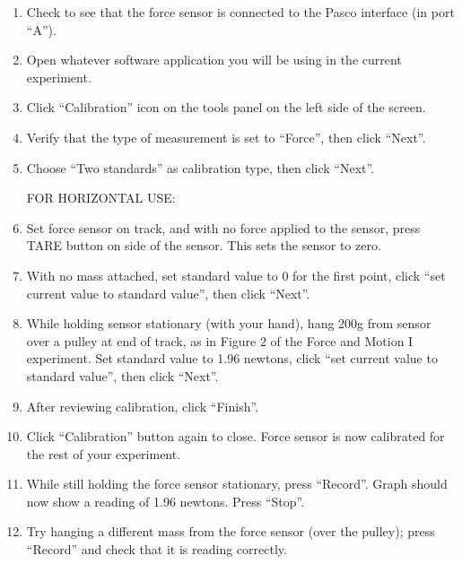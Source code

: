 \begin{enumerate}
\item Check to see that the force sensor is connected to the Pasco interface (in port ``A'').

\item Open whatever software application you will be using in the current experiment.

\item Click ``Calibration'' icon on the tools panel on the left side of the screen.

\item Verify that the type of measurement is set to ``Force'', then click ``Next''.

\item Choose ``Two standards'' as calibration type, then click ``Next''.

\vspace{0.1in}
\hspace{-0.2in}FOR HORIZONTAL USE:

\item Set force sensor on track, and with no force applied to the sensor, press TARE button on side of the sensor. This sets the sensor to zero.

\item With no mass attached, set standard value to 0 for the first point, click ``set current value to standard value'', then click ``Next''.

\item While holding sensor stationary (with your hand), hang 200g from sensor over a pulley at end of track, as in Figure 2 of the Force and Motion I experiment. Set standard value to 1.96 newtons, click ``set current value to standard value'', then click ``Next''.

\item After reviewing calibration, click ``Finish''.

\item Click ``Calibration'' button again to close. Force sensor is now calibrated for the rest of your experiment.

\item While still holding the force sensor stationary, press ``Record''. Graph should now show a reading of 1.96 newtons. Press ``Stop''.

\item Try hanging a different mass from the force sensor (over the pulley); press ``Record'' and check that it is reading correctly.


\end{enumerate}
